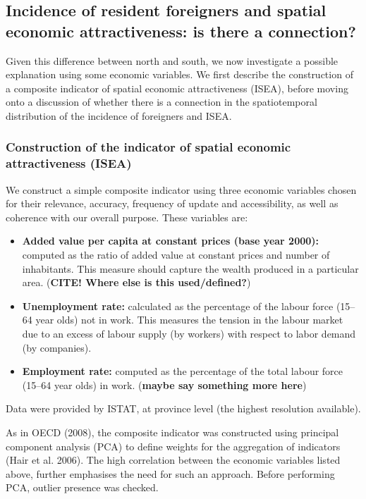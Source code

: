 \documentclass[10pt]{article}
\theoremstyle{definition}
\theoremstyle{plain}
\begin{document}
\subsection{Incidence of resident foreigners and spatial economic attractiveness: is there a connection? \label{NEX}}

Given this difference between north and south, we now investigate a possible explanation using some economic variables. We first describe the construction of a composite indicator of spatial economic attractiveness (ISEA), before moving onto a discussion of whether there is a connection in the spatiotemporal distribution of the incidence of foreigners and ISEA.

\subsubsection{Construction of the indicator of spatial economic attractiveness (ISEA) \label{ISEA}}

We construct a simple composite indicator using three economic variables chosen for their relevance, accuracy, frequency of update and accessibility, as well as coherence with our overall purpose. These variables are:

\begin{itemize}
\item \textbf{Added value per capita at constant prices (base year 2000):} computed as the ratio of added value at constant prices and number of inhabitants. This measure should capture the wealth produced in a particular area. (\textbf{CITE! Where else is this used/defined?})
\item \textbf{Unemployment rate:} calculated as the percentage of the labour force (15--64 year olds) not in work. This measures the tension in the labour market due to an excess of labour supply (by workers) with respect to labor demand (by companies).
\item \textbf{Employment rate:} computed as the percentage of the total labour force (15--64 year olds) in work. (\textbf{maybe say something more here})
\end{itemize}

Data were provided by ISTAT, at province level (the highest resolution available).

As in OECD (2008), the composite indicator was constructed using principal component analysis (PCA) to define weights for the aggregation of indicators (Hair et al. 2006). The high correlation between the economic variables listed above, further emphasises the need for such an approach. Before performing PCA, outlier presence was checked.
\end{document}
